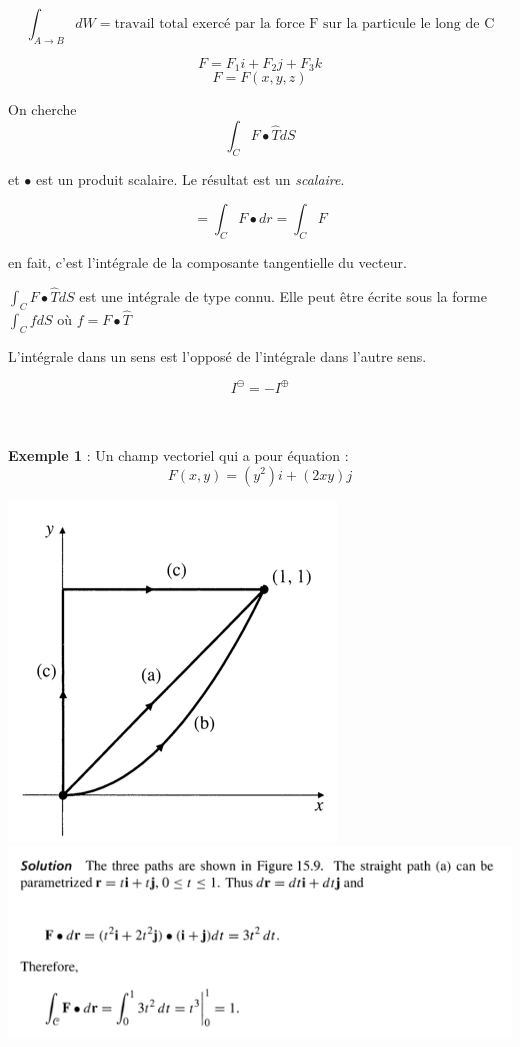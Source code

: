 \[\int_{A\to B} dW = \text{travail total exercé par la force F sur la particule le long de C}\]


\[F=F_1 i + F_2 j +F_3 k\]
\[F = F(x,y,z)\]

On cherche
\[\int_CF\bullet \hat T dS\]

et $\bullet$ est un produit scalaire. Le résultat est un \emph{scalaire}.

\[= \int_C F\bullet dr = \int_C F\]

en fait, c'est l'intégrale de la composante tangentielle du vecteur.

$\int_CF\bullet \hat T dS$ est une intégrale de type connu. Elle peut être écrite sous la forme $\int_C f dS$ où $f=F \bullet \hat{T}$

L'intégrale dans un sens est l'opposé de l'intégrale dans l'autre sens.

\[I^{\ominus} = -I^{\oplus}\]



\\
\\
\textbf{Exemple 1} :
Un champ vectoriel qui a pour équation :
\[F(x,y)=(y^2)i+(2xy)j\]

\includegraphics[scale=0.6]{courbe3.png}\\
\includegraphics[scale=0.6]{resolu1.png}

